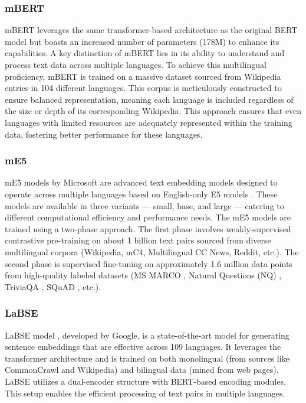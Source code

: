 \subsubsection{mBERT} \label{model:mbert}
\ac{mBERT} \cite{devlin2019bert} leverages the same transformer-based architecture as the original \ac{BERT} model but boasts an increased number of parameters (178M) to enhance its capabilities.
A key distinction of \ac{mBERT} lies in its ability to understand and process text data across multiple languages.
To achieve this multilingual proficiency, \ac{mBERT} is trained on a massive dataset sourced from Wikipedia entries in 104 different languages.
This corpus is meticulously constructed to ensure balanced representation, meaning each language is included regardless of the size or depth of its corresponding Wikipedia.
This approach ensures that even languages with limited resources are adequately represented within the training data, fostering better performance for these languages.

\subsubsection{\ac{mE5}} \label{model:me5}
\ac{mE5} models by Microsoft \cite{wang2024multilingual} are advanced text embedding models designed to operate across multiple languages based on English-only E5 models \cite{wang2024text}.
These models are available in three variants — small, base, and large — catering to different computational efficiency and performance needs.
The \ac{mE5} models are trained using a two-phase approach.
The first phase involves weakly-supervised contrastive pre-training on about 1 billion text pairs sourced from diverse multilingual corpora (Wikipedia, mC4, Multilingual CC News, Reddit, etc.).
The second phase is supervised fine-tuning on approximately 1.6 million data points from high-quality labeled datasets (MS MARCO \cite{bajaj2018ms}, Natural Questions (NQ) \cite{kwiatkowski2019natural}, TriviaQA \cite{joshi2017triviaqa}, SQuAD \cite{rajpurkar2016squad}, etc.).

\subsubsection{LaBSE} \label{model:labse}
\ac{LaBSE} model \cite{feng2022languageagnostic}, developed by Google, is a state-of-the-art model for generating sentence embeddings that are effective across 109 languages.
It leverages the transformer architecture and is trained on both monolingual (from sources like CommonCrawl \cite{commoncrawl} and Wikipedia) and bilingual data (mined from web pages).
LaBSE utilizes a dual-encoder structure with \ac{BERT}-based encoding modules.
This setup enables the efficient processing of text pairs in multiple languages.


